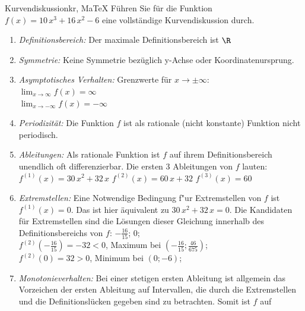  \providecommand{\MoIl}{(} 
 \providecommand{\MoIr}{)}
 \providecommand{\MIntvlSep}{;} 
 \providecommand{\MElSetSep}{;} 
 \begin{MAufgabe}{Kurvendiskussion}{kr, MaTeX}
 F\"uhren Sie f\"ur die Funktion $f(x)=10\, x^3 + 16\, x^2 - 6$ eine vollst\"andige Kurvendiskussion durch.\\ 
 \ifLsg\Loesung
 \begin{enumerate}
 \item \emph{Definitionsbereich:} 
 Der maximale Definitionsbereich ist $\R$\item \emph{Symmetrie:} 
 Keine Symmetrie bez\"uglich y-Achse oder Koordinatenursprung.\item \emph{Asymptotisches Verhalten:} 
 Grenzwerte f\"ur $x\rightarrow \pm \infty$: \\ 
 $\lim_{x\rightarrow \infty} f(x)=\infty$ \\ 
 $\lim_{x\rightarrow -\infty} f(x)=- \infty$ \\ 
 \item \emph{Periodizit\"at:} 
 Die Funktion $f$ ist als rationale (nicht konstante) Funktion nicht periodisch.\item \emph{Ableitungen:} 
 Als rationale Funktion ist $f$ auf ihrem Definitionsbereich unendlich oft differenzierbar. 
 Die ersten 3 Ableitungen von $f$ lauten: \\ 
 $f^{(1)}(x)=30\, x^2 + 32\, x$\newline 
  $f^{(2)}(x)=60\, x + 32$\newline 
  $f^{(3)}(x)=60$\newline 
  \item \emph{Extremstellen:} 
 Eine Notwendige Bedingung f"ur Extremstellen von $f$ ist $f^{(1)}(x)=0$. 
 Das ist hier \"aquivalent zu $30\, x^2 + 32\, x=0$. 
 Die Kandidaten f\"ur Extremstellen sind die L\"osungen dieser Gleichung innerhalb des Definitionsbereichs von $f$: $- \frac{16}{15}$; $0$; \\ 
 $f^{(2)}(- \frac{16}{15})=-32$$<0$, Maximum bei $(- \frac{16}{15};\frac{46}{675})$; \\ 
 $f^{(2)}(0)=32$$>0$, Minimum bei $(0;-6)$; \\ 
 \item \emph{Monotonieverhalten:} 
 Bei einer stetigen ersten Ableitung ist allgemein das Vorzeichen der ersten Ableitung auf Intervallen, die durch die Extremstellen und die Definitionsl\"ucken gegeben sind zu betrachten. Somit ist $f$ auf \\ 

\end{enumerate}
\end{MAufgabe}
